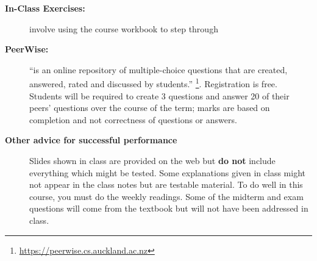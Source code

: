 \documentclass[12pt]{article}
\begin{document}
\begin{description}
\item[\bf In-Class Exercises:] involve using the course workbook to step through 

\item[\bf PeerWise:]  ``is an online repository of multiple-choice questions that are created, answered, rated and discussed by students.''%
\footnote{\url{https://peerwise.cs.auckland.ac.nz}}. Registration is free. Students will be required to create 3 questions and answer
20 of their peers' questions over the course of the term; marks are based on completion and not correctness of questions or answers.

\item[\bf Other advice for successful performance] Slides shown in class are provided on the web but {\bf do not} include 
everything which might be tested. Some explanations given in class might not appear in the class notes but are testable material. 
To do well in this course, you must do the weekly readings. Some of the midterm and exam questions will come from the 
textbook but will not have been addressed in class.
\end{description}

\clearpage
\end{document}

